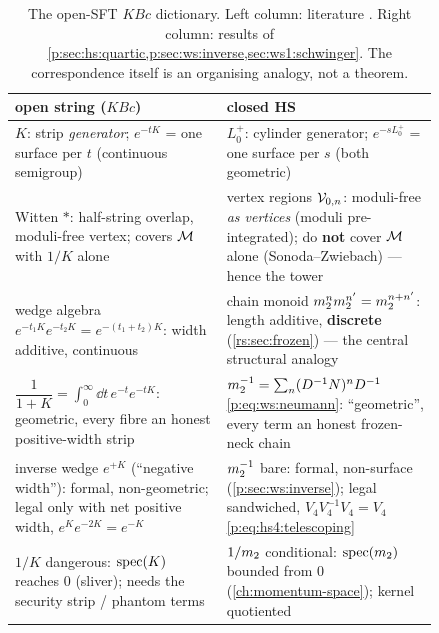 \begin{table}[htp]
	\centering
	\renewcommand{\arraystretch}{1.3}
	\begin{tabular}{p{0.42\linewidth}p{0.42\linewidth}}
		\toprule
		open string ($KBc$) & closed HS \\
		\midrule
		$K$: strip \emph{generator}; $e^{-tK}$ = one surface per $t$ (continuous semigroup)
		& $L_0^+$: cylinder generator; $e^{-sL_0^+}$ = one surface per $s$ (both geometric) \\
		Witten $*$: half-string overlap, moduli-free vertex; covers ${\mathcal{M}}$ with $1/K$ alone \cite{GiddingsMartinecWitten1986}
		& vertex regions ${\mathcal{V}}_{0,n}$: moduli-free \emph{as vertices} (moduli pre-integrated); do \textbf{not} cover ${\mathcal{M}}$ alone (Sonoda--Zwiebach) --- hence the tower \\
		wedge algebra $e^{-t_1K}e^{-t_2K}=e^{-(t_1+t_2)K}$: width additive, continuous
		& chain monoid $m_2^{n}m_2^{n'}=m_2^{n+n'}$: length additive, \textbf{discrete} (\cref{rs:sec:frozen}) --- the central structural analogy \\
		$\dfrac{1}{1+K}=\int_0^\infty\!\dd t\,e^{-t}e^{-tK}$: geometric, every fibre an honest positive-width strip
		& $m_2^{-1}=\sum_n (D^{-1}N)^nD^{-1}$ \eqref{p:eq:ws:neumann}: ``geometric'', every term an honest frozen-neck chain \\
		inverse wedge $e^{+K}$ (``negative width''): formal, non-geometric; legal only with net positive width, $e^{K}e^{-2K}=e^{-K}$
		& $m_2^{-1}$ bare: formal, non-surface (\cref{p:sec:ws:inverse}); legal sandwiched, $V_4V_4^{-1}V_4=V_4$ \eqref{p:eq:hs4:telescoping} \\
		$1/K$ dangerous: $\operatorname{spec}(K)$ reaches $0$ (sliver); needs the security strip / phantom terms
		& $1/m_2$ conditional: $\operatorname{spec}(m_2)$ bounded from $0$ (\cref{ch:momentum-space}); kernel quotiented \\
		\bottomrule
	\end{tabular}
	\caption{The open-SFT $KBc$ dictionary. Left column: literature
	\cite{Schnabl2005,ErlerSchnabl2009,Erler2019,GiddingsMartinecWitten1986}.
	Right column: results of \cref{p:sec:hs:quartic,p:sec:ws:inverse,sec:ws1:schwinger}. The correspondence itself is an
	organising analogy, not a theorem.}
	\label{rs:tab:osft}
\end{table}

